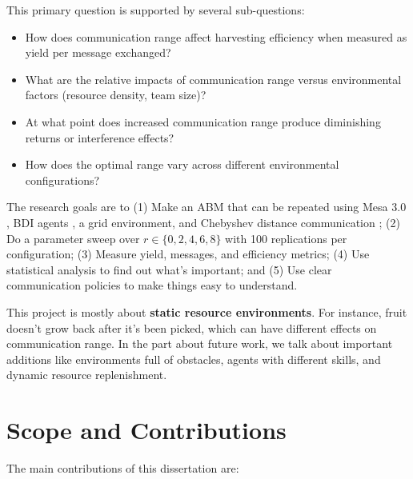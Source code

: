 This primary question is supported by several sub-questions:

\begin{itemize}
    \item How does communication range affect harvesting efficiency when measured as yield per message exchanged?
    \item What are the relative impacts of communication range versus environmental factors (resource density, team size)?
    \item At what point does increased communication range produce diminishing returns or interference effects?
    \item How does the optimal range vary across different environmental configurations?
\end{itemize}

The research goals are to (1) Make an ABM that can be repeated using Mesa 3.0 \citep{kazil2020}, BDI agents \citep{bratman1987intention}, a grid environment, and Chebyshev distance communication \citep{deza2009encyclopedia}; (2) Do a parameter sweep over $r \in \{0, 2, 4, 6, 8\}$ with 100 replications per configuration; (3) Measure yield, messages, and efficiency metrics; (4) Use statistical analysis to find out what's important; and (5) Use clear communication policies to make things easy to understand.

This project is mostly about \textbf{static resource environments}. For instance, fruit doesn't grow back after it's been picked, which can have different effects on communication range. In the part about future work, we talk about important additions like environments full of obstacles, agents with different skills, and dynamic resource replenishment.

\section{Scope and Contributions}

The main contributions of this dissertation are:

